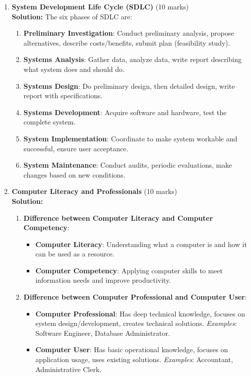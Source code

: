 \documentclass[12pt]{article}
\begin{document}
\begin{enumerate}[left=0pt, label=\bfseries Q\arabic*., start=1]
    \item \textbf{System Development Life Cycle (SDLC)} \hfill (10 marks)\\
    \textbf{Solution:} The six phases of SDLC are:
    \begin{enumerate}[label=(\alph*)]
        \item \textbf{Preliminary Investigation}: Conduct preliminary analysis, propose alternatives, describe costs/benefits, submit plan (feasibility study).
        \item \textbf{Systems Analysis}: Gather data, analyze data, write report describing what system does and should do.
        \item \textbf{Systems Design}: Do preliminary design, then detailed design, write report with specifications.
        \item \textbf{Systems Development}: Acquire software and hardware, test the complete system.
        \item \textbf{System Implementation}: Coordinate to make system workable and successful, ensure user acceptance.
        \item \textbf{System Maintenance}: Conduct audits, periodic evaluations, make changes based on new conditions.
    \end{enumerate}

    \item \textbf{Computer Literacy and Professionals} \hfill (10 marks)\\
    \textbf{Solution:}
    \begin{enumerate}[label=(\alph*)]
        \item \textbf{Difference between Computer Literacy and Computer Competency}:
        \begin{itemize}
            \item \textbf{Computer Literacy}: Understanding what a computer is and how it can be used as a resource.
            \item \textbf{Computer Competency}: Applying computer skills to meet information needs and improve productivity.
        \end{itemize}
        \item \textbf{Difference between Computer Professional and Computer User}:
        \begin{itemize}
            \item \textbf{Computer Professional}: Has deep technical knowledge, focuses on system design/development, creates technical solutions. \textit{Examples}: Software Engineer, Database Administrator.
            \item \textbf{Computer User}: Has basic operational knowledge, focuses on application usage, uses existing solutions. \textit{Examples}: Accountant, Administrative Clerk.
        \end{itemize}
    \end{enumerate}


\end{enumerate}
\end{document}
